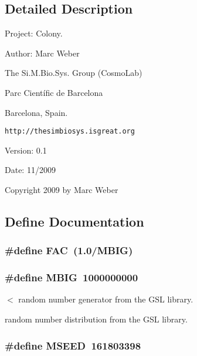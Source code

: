 \subsection{Detailed Description}
Project: Colony. 

\begin{Desc}
\item[Author:]Marc Weber\par
 The Si.M.Bio.Sys. Group (CosmoLab)\par
 Parc Científic de Barcelona\par
 Barcelona, Spain.\par
 {\tt http://thesimbiosys.isgreat.org} \end{Desc}
\begin{Desc}
\item[Version:]0.1 \end{Desc}
\begin{Desc}
\item[Date:]11/2009\end{Desc}
Copyright 2009 by Marc Weber 

\subsection{Define Documentation}
\subsubsection{\setlength{\rightskip}{0pt plus 5cm}\#define FAC~(1.0/MBIG)}\label{RandomNumberGenerator_8h_8c3c7226e23b36189d1ec6b7d3504499}


\subsubsection{\setlength{\rightskip}{0pt plus 5cm}\#define MBIG~1000000000}\label{RandomNumberGenerator_8h_31be5e3096afa10fc67bd629dd9332e7}


$<$ random number generator from the GSL library. 

random number distribution from the GSL library. 
\subsubsection{\setlength{\rightskip}{0pt plus 5cm}\#define MSEED~161803398}\label{RandomNumberGenerator_8h_a0e8039431bb68581133ef4c1dbbe71d}



